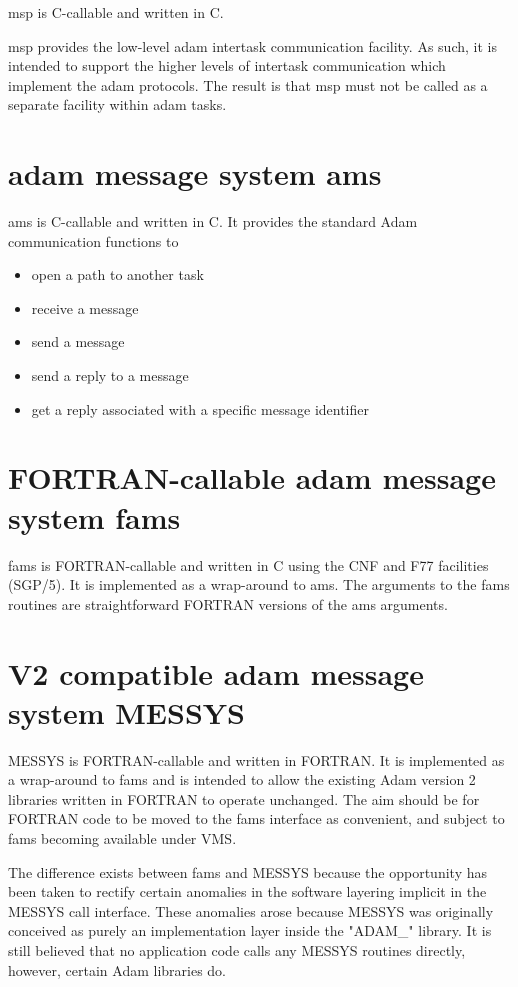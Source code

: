 msp is C-callable and written in C.

msp provides the low-level adam intertask communication facility. As
such, it is intended to support the higher levels of intertask
communication which implement the adam protocols. The result is that msp
must not be called as a separate facility within adam tasks.

\section {adam message system ams}

ams is C-callable and written in C. It provides the standard Adam
communication functions to

\begin{itemize}
\item open a path to another task
\item receive a message
\item send a message
\item send a reply to a message
\item get a reply associated with a specific message identifier
\end{itemize}

\section {FORTRAN-callable adam message system fams}

fams is FORTRAN-callable and written in C using the CNF and F77
facilities (SGP/5). It is implemented as a wrap-around to ams. The arguments
to the fams routines are straightforward FORTRAN versions of the ams
arguments.

\section {V2 compatible adam message system MESSYS}

MESSYS is FORTRAN-callable and written in FORTRAN. It is implemented as a
wrap-around to fams and is intended to allow the existing Adam version 2
libraries written in FORTRAN to operate unchanged. The aim should be for
FORTRAN code to be moved to the fams interface as convenient, and subject
to fams becoming available under VMS.

The difference exists between fams and MESSYS because the opportunity has
been taken to rectify certain anomalies in the software layering implicit
in the MESSYS call interface. These anomalies arose because MESSYS was
originally conceived as purely an implementation layer inside the "ADAM\_"
library. It is still believed that no application code calls any MESSYS
routines directly, however, certain Adam libraries do.

